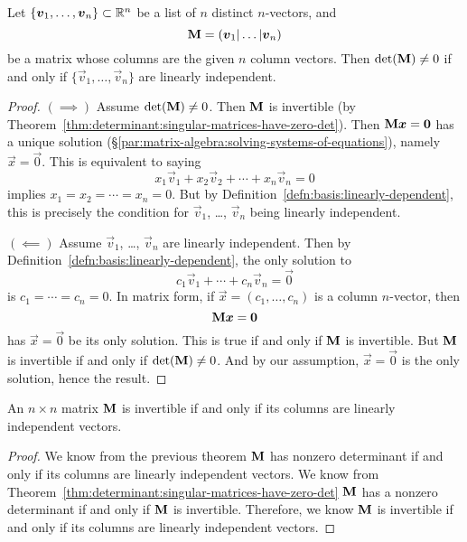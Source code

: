 \begin{theorem}
Let $\{\boldsymbol{v}_{1},\dots,\boldsymbol{v}_{n}\}\subset\mathbb{R}^{n}$ be a list of $n$
distinct $n$-vectors, and
\begin{equation}
\mathbf{M} = (\boldsymbol{v}_{1}|\dots|\boldsymbol{v}_{n})
\end{equation}
be a matrix whose columns are the given $n$ column vectors.
Then $\det(\mathbf{M})\neq0$ if and only if $\{\vec{v}_{1},\dots,\vec{v}_{n}\}$
are linearly independent.
\end{theorem}

\begin{proof}
$(\implies)$ Assume $\det(\mathbf{M})\neq0$. Then $\mathbf{M}$ is invertible
  (by Theorem~\ref{thm:determinant:singular-matrices-have-zero-det}).
Then $\mathbf{M}\boldsymbol{x}=\boldsymbol{0}$ has a unique solution (\S\ref{par:matrix-algebra:solving-systems-of-equations}), namely $\vec{x}=\vec{0}$.
This is equivalent to saying
\begin{equation}
x_{1}\vec{v}_{1} + x_{2}\vec{v}_{2} + \cdots + x_{n}\vec{v}_{n} = 0
\end{equation}
implies $x_{1}=x_{2}=\cdots=x_{n}=0$. But by Definition~\ref{defn:basis:linearly-dependent},
this is precisely the condition for $\vec{v}_{1}$, \dots, $\vec{v}_{n}$
being linearly independent.

$(\impliedby)$ Assume $\vec{v}_{1}$, \dots, $\vec{v}_{n}$ are linearly
independent. Then by Definition~\ref{defn:basis:linearly-dependent}, the
only solution to
\begin{equation}
c_{1}\vec{v}_{1} + \cdots + c_{n}\vec{v}_{n} = \vec{0}
\end{equation}
is $c_{1}=\cdots=c_{n}=0$. In matrix form, if $\vec{x}=(c_{1},\dots,c_{n})$
is a column $n$-vector, then
\begin{equation}
\mathbf{M}\boldsymbol{x} = \boldsymbol{0}
\end{equation}
has $\vec{x}=\vec{0}$ be its only solution. This is true if and only if
$\mathbf{M}$ is invertible. But $\mathbf{M}$ is invertible if and only if
$\det(\mathbf{M})\neq0$. And by our assumption, $\vec{x}=\vec{0}$ is the
only solution, hence the result.
\end{proof}

\begin{corollary}\label{cor:basis:invertible-matrix-iff-columns-are-linearly-independent}
An $n\times n$ matrix $\mathbf{M}$ is invertible if and only if its columns are
linearly independent vectors.
\end{corollary}
\begin{proof}
We know from the previous theorem $\mathbf{M}$ has nonzero determinant if
and only if its columns are linearly independent vectors. We know from Theorem~\ref{thm:determinant:singular-matrices-have-zero-det}
$\mathbf{M}$ has a nonzero determinant if and only if $\mathbf{M}$ is
invertible.
Therefore, we know $\mathbf{M}$ is invertible if and only if its columns
are linearly independent vectors.
\end{proof}

